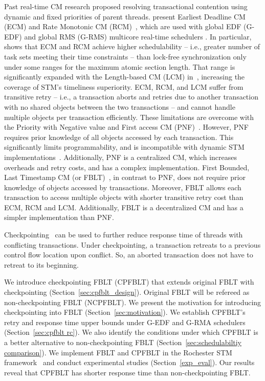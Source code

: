 \documentclass[conference]{IEEEtran}
\begin{document}
Past real-time CM research proposed resolving transactional contention using dynamic and fixed priorities of parent threads. \cite{6045438,stmconcurrencycontrol:emsoft11,lcmdac2012} present  Earliest Deadline CM (ECM) and Rate Monotonic CM (RCM)~, which are used with global EDF (G-EDF) and global RMS (G-RMS) multicore real-time schedulers \cite{Davis:2011:SHR:1978802.1978814}.
In particular,~\cite{stmconcurrencycontrol:emsoft11} shows that ECM and RCM achieve higher schedulability -- i.e., greater number of task sets meeting their time constraints -- than lock-free synchronization only under some ranges for the maximum atomic section length. That range is significantly expanded with the Length-based CM (LCM) in~\cite{lcmdac2012}, increasing the coverage of STM's timeliness superiority. ECM, RCM, and LCM suffer from transitive retry -- i.e., a transaction aborts and retries due to another transaction with no shared objects between the two transactions -- and cannot handle multiple objects per transaction efficiently. These limitations are overcome with the Priority with Negative value and First access CM (PNF)~\cite{pnf_dac_asp,shambake_phd_proposal}. However, PNF requires prior knowledge of all objects accessed by each transaction. This significantly limits programmability, and is incompatible with dynamic STM implementations~\cite{Herlihy:2003:STM:872035.872048}. Additionally, PNF is a centralized CM, which increases overheads and retry costs, and has a complex implementation. First Bounded, Last Timestamp CM (or FBLT)~\cite{fblt}, in contrast to PNF, does not require prior knowledge of objects accessed by transactions. Moreover, FBLT allows each transaction to access multiple objects with shorter transitive retry cost than ECM, RCM and LCM. Additionally, FBLT is a decentralized CM and has a simpler implementation than PNF.

Checkpointing~\cite{Koskinen:2008:CCI:1378533.1378563} can be used to further reduce response time of threads with conflicting transactions. Under checkpointing, a transaction retreats to a previous control flow location upon conflict. So, an aborted transaction does not have to retreat to its beginning.

We introduce checkpointing FBLT (CPFBLT) that extends original FBLT with checkpointing (Section~\ref{sec:cpfblt_design}). Original FBLT will be refereed as non-checkpointing FBLT (NCPFBLT). We present the motivation for introducing checkpointing into FBLT (Section~\ref{sec:motivation}). We establish CPFBLT's retry and response time upper bounds under G-EDF and G-RMA schedulers (Section~\ref{sec:cpfblt rc}). We also identify the conditions under which CPFBLT is a better alternative to non-checkpointing FBLT (Section~\ref{sec:schedulabiltiy comparison}). We implement FBLT and CPFBLT in the Rochester STM framework~\cite{marathe2006lowering} and conduct experimental studies (Section~\ref{exp_eval}). Our results reveal that CPFBLT has shorter response time than non-checkpointing FBLT.
\end{document}
